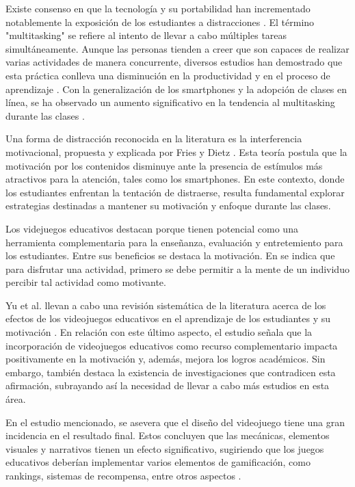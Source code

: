 Existe consenso en que la tecnología y su portabilidad han incrementado notablemente la exposición de los estudiantes a distracciones \cite{Zimmerman2011HandbookOS, Wang2022ComprehensivelySummarizeDistractions}. El término "multitasking" se refiere al intento de llevar a cabo múltiples tareas simultáneamente. Aunque las personas tienden a creer que son capaces de realizar varias actividades de manera concurrente, diversos estudios han demostrado que esta práctica conlleva una disminución en la productividad y en el proceso de aprendizaje \cite{Domoff2019AddictivePU}. Con la generalización de los smartphones y la adopción de clases en línea, se ha observado un aumento significativo en la tendencia al multitasking durante las clases \cite{Wang2022ComprehensivelySummarizeDistractions}.

Una forma de distracción reconocida en la literatura es la interferencia motivacional, propuesta y explicada por Fries y Dietz \cite{Fries2007LearningMotivationalInterference}. Esta teoría postula que la motivación por los contenidos disminuye ante la presencia de estímulos más atractivos para la atención, tales como los smartphones. En este contexto, donde los estudiantes enfrentan la tentación de distraerse, resulta fundamental explorar estrategias destinadas a mantener su motivación y enfoque durante las clases.

Los videjuegos educativos destacan porque tienen potencial como una herramienta complementaria para la enseñanza, evaluación y entretemiento para los estudiantes. Entre sus beneficios se destaca la motivación. En \cite{Bisson1996FunInLEarningPedagogicalRole} se indica que para disfrutar una actividad, primero se debe permitir a la mente de un individuo percibir tal actividad como motivante. 

Yu et al. llevan a cabo una revisión sistemática de la literatura acerca de los efectos de los videojuegos educativos en el aprendizaje de los estudiantes y su motivación \cite{Yu2020TheEffectsOfEducationGames}. En relación con este último aspecto, el estudio señala que la incorporación de videojuegos educativos como recurso complementario impacta positivamente en la motivación y, además, mejora los logros académicos. Sin embargo, también destaca la existencia de investigaciones que contradicen esta afirmación, subrayando así la necesidad de llevar a cabo más estudios en esta área.

En el estudio mencionado, se asevera que el diseño del videojuego tiene una gran incidencia en el resultado final. Estos concluyen que las mecánicas, elementos visuales y narrativos tienen un efecto significativo, sugiriendo que los juegos educativos deberían implementar varios elementos de gamificación, como rankings, sistemas de recompensa, entre otros aspectos \cite{Yu2020TheEffectsOfEducationGames}.

